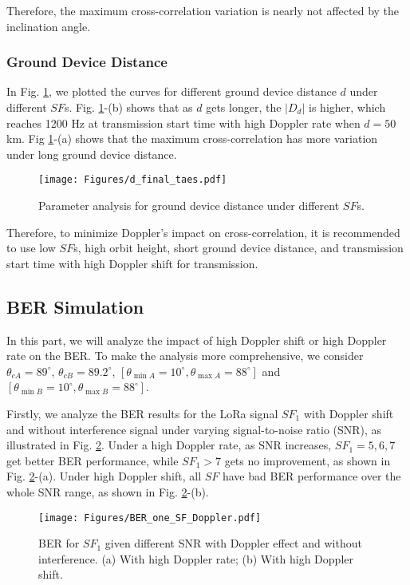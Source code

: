 \documentclass{IEEEtaes}
\theoremstyle{plain}
\begin{document}
Therefore, the maximum cross-correlation variation is nearly not affected by the inclination angle.

\subsubsection{Ground Device Distance}
In Fig. \ref{d_final}, we plotted the curves for different ground device distance $d$ under different $SF$s. 
Fig. \ref{d_final}-(b) shows that as $d$ gets longer, the $|D_d|$ is higher, which reaches 1200 \rm{Hz} at transmission start time with high Doppler rate when $d = 50$ \rm{km}. Fig \ref{d_final}-(a) shows that the maximum cross-correlation has more variation under long ground device distance.

\begin{figure}[ht]
  \centering
  \texttt{[image: Figures/d\_final\_taes.pdf]}
  \caption{Parameter analysis for ground device distance under different $SF$s.}
  \label{d_final}
\end{figure}
Therefore, to minimize Doppler's impact on cross-correlation, it is recommended to use low $SF$s, high orbit height, short ground device distance, and transmission start time with high Doppler shift for transmission.

\subsection{BER Simulation}
In this part, we will analyze the impact of high Doppler shift or high Doppler rate on the BER. To make the analysis more comprehensive, we consider $\theta_{c\!A}=89^\circ$, $\theta_{c\!B}=89.2^\circ$, $[\theta_{\min \!A}=10^\circ, \theta_{\max \!A}=88^\circ]$ and $[\theta_{\min \!B}=10^\circ, \theta_{\max \!B}=88^\circ]$.

Firstly, we analyze the BER results for the LoRa signal $SF_1$ with Doppler shift and without interference signal under varying signal-to-noise ratio (SNR), as illustrated in Fig. \ref{BER_one_SF_Doppler}.  Under a high Doppler rate, as SNR increases, $SF_1 = 5,6,7$ get better BER performance, while $SF_1 >7$ gets no improvement, as shown in Fig. \ref{BER_one_SF_Doppler}-(a). Under high Doppler shift, all $SF$ have bad BER performance over the whole SNR range, as shown in Fig. \ref{BER_one_SF_Doppler}-(b). 
\begin{figure}[ht]
  \centering
  \texttt{[image: Figures/BER\_one\_SF\_Doppler.pdf]}
  \caption{BER for $SF_1$ given different SNR with Doppler effect and without interference. (a) With high Doppler rate; (b) With high Doppler shift.}
  \label{BER_one_SF_Doppler}
\end{figure}
\end{document}
